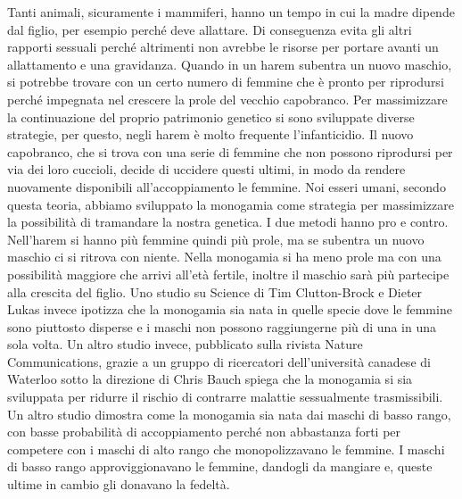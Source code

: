 \documentclass[12pt]{book} %
\begin{document}
Tanti animali, sicuramente i mammiferi, hanno un tempo in cui la madre dipende dal figlio, per esempio perché deve
allattare. Di conseguenza evita gli altri rapporti sessuali perché altrimenti non avrebbe le risorse per portare avanti
un allattamento e una gravidanza. Quando in un harem subentra un nuovo maschio, si potrebbe trovare con un certo numero
di femmine che è pronto per riprodursi perché impegnata nel crescere la prole del vecchio capobranco. Per massimizzare
la continuazione del proprio patrimonio genetico si sono sviluppate diverse strategie, per questo, negli harem è molto
frequente l'infanticidio. Il nuovo capobranco, che si trova con una serie di femmine che non
possono riprodursi per via dei loro cuccioli, decide di uccidere questi ultimi, in modo da rendere nuovamente
disponibili all'accoppiamento le femmine. Noi esseri umani, secondo questa teoria, abbiamo
sviluppato la monogamia come strategia per massimizzare la possibilità di tramandare la nostra genetica. I due metodi
hanno pro e contro. Nell'harem si hanno più femmine quindi più prole, ma se subentra un nuovo
maschio ci si ritrova con niente. Nella monogamia si ha meno prole ma con una possibilità maggiore che arrivi
all'età fertile, inoltre il maschio sarà più partecipe alla crescita del figlio. Uno studio su
Science di Tim Clutton-Brock e Dieter Lukas invece ipotizza
che la monogamia sia nata in quelle specie dove le femmine sono piuttosto disperse e i maschi non possono raggiungerne
più di una in una sola volta. Un altro studio invece, pubblicato sulla rivista Nature Communications, grazie a un
gruppo di ricercatori dell'università canadese di Waterloo sotto la direzione di Chris Bauch
spiega che la monogamia si sia sviluppata per ridurre il rischio di contrarre malattie sessualmente
trasmissibili. Un altro studio dimostra come la monogamia sia
nata dai maschi di basso rango, con basse probabilità di accoppiamento perché non abbastanza forti per competere con i
maschi di alto rango che monopolizzavano le femmine. I maschi di basso rango approviggionavano le femmine, dandogli da
mangiare e, queste ultime in cambio gli donavano la fedeltà. \ 
\end{document}
